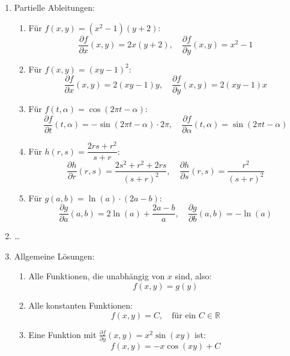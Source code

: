 \begin{enumerate}
	\item Partielle Ableitungen:
	      \begin{enumerate}
		      \item Für \( f(x, y) = (x^2 - 1)(y + 2) \):
		            \[
			            \frac{\partial f}{\partial x}(x, y) = 2x(y + 2), \quad
			            \frac{\partial f}{\partial y}(x, y) = x^2 - 1
		            \]

		      \item Für \( f(x, y) = (xy - 1)^2 \):
		            \[
			            \frac{\partial f}{\partial x}(x, y) = 2(xy - 1)y, \quad
			            \frac{\partial f}{\partial y}(x, y) = 2(xy - 1)x
		            \]

		      \item Für \( f(t, \alpha) = \cos(2\pi t - \alpha) \):
		            \[
			            \frac{\partial f}{\partial t}(t, \alpha) = -\sin(2\pi t - \alpha) \cdot 2\pi, \quad
			            \frac{\partial f}{\partial \alpha}(t, \alpha) = \sin(2\pi t - \alpha)
		            \]

		      \item Für \( h(r, s) = \dfrac{2rs + r^2}{s + r} \):
		            \[
			            \frac{\partial h}{\partial r}(r, s) = \frac{2s^2 + r^2 + 2rs}{(s + r)^2}, \quad
			            \frac{\partial h}{\partial s}(r, s) = \frac{r^2}{(s + r)^2}
		            \]

		      \item Für \( g(a, b) = \ln(a) \cdot (2a - b) \):
		            \[
			            \frac{\partial g}{\partial a}(a, b) = 2\ln(a) + \frac{2a - b}{a}, \quad
			            \frac{\partial g}{\partial b}(a, b) = -\ln(a)
		            \]
	      \end{enumerate}
	\item \dots

	\item Allgemeine Lösungen:
	      \begin{enumerate}
		      \item Alle Funktionen, die unabhängig von \( x \) sind, also:
		            \[
			            f(x, y) = g(y)
		            \]

		      \item Alle konstanten Funktionen:
		            \[
			            f(x, y) = C, \quad \text{für ein } C \in \mathbb{R}
		            \]

		      \item Eine Funktion mit \( \frac{\partial f}{\partial y}(x, y) = x^2 \sin(xy) \) ist:
		            \[
			            f(x, y) = -x \cos(xy) + C
		            \]
	      \end{enumerate}
\end{enumerate}


























